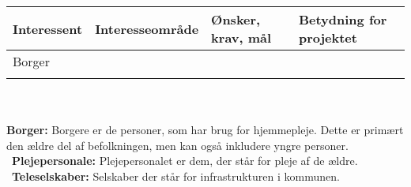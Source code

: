 \documentclass[10pt,a4paper]{article}
\begin{document}
\begin{tabular}{|l|l|l|l|}
\hline
\textbf{Interessent} & \textbf{Interesseområde}  & \textbf{Ønsker, krav, mål}  & \textbf{Betydning for projektet} \\ \hline
Borger &  &  &  \\ \hline
 &  &  &  \\ \hline
\end{tabular}
\\ \\
\textbf{Borger:} Borgere er de personer, som har brug for hjemmepleje. Dette er primært den ældre del af befolkningen, men kan også inkludere yngre personer.\\ 
\
\textbf{Plejepersonale:} Plejepersonalet er dem, der står for pleje af de ældre.
\\
\
\textbf{Teleselskaber:} Selskaber der står for infrastrukturen i kommunen. 
\end{document}
